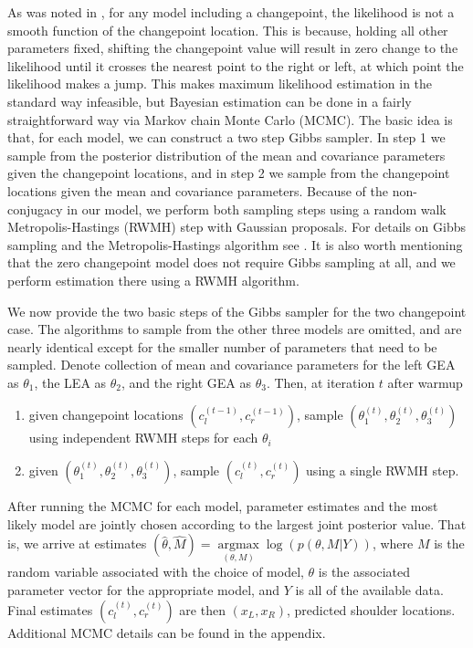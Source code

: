 \documentclass[12pt]{article}
\providecommand{\tightlist}{%
  \setlength{\itemsep}{0pt}\setlength{\parskip}{0pt}}
\begin{document}
As was noted in \citet{stephens1994}, for any model including a
changepoint, the likelihood is not a smooth function of the changepoint
location. This is because, holding all other parameters fixed, shifting
the changepoint value will result in zero change to the likelihood until
it crosses the nearest point to the right or left, at which point the
likelihood makes a jump. This makes maximum likelihood estimation in the
standard way infeasible, but Bayesian estimation can be done in a fairly
straightforward way via Markov chain Monte Carlo (MCMC). The basic idea
is that, for each model, we can construct a two step Gibbs sampler. In
step 1 we sample from the posterior distribution of the mean and
covariance parameters given the changepoint locations, and in step 2 we
sample from the changepoint locations given the mean and covariance
parameters. Because of the non-conjugacy in our model, we perform both
sampling steps using a random walk Metropolis-Hastings (RWMH) step with
Gaussian proposals. For details on Gibbs sampling and the
Metropolis-Hastings algorithm see \citet{gelman2013}. It is also worth
mentioning that the zero changepoint model does not require Gibbs
sampling at all, and we perform estimation there using a RWMH algorithm.

We now provide the two basic steps of the Gibbs sampler for the two
changepoint case. The algorithms to sample from the other three models
are omitted, and are nearly identical except for the smaller number of
parameters that need to be sampled. Denote collection of mean and
covariance parameters for the left GEA as \(\theta_1\), the LEA as
\(\theta_2\), and the right GEA as \(\theta_3\). Then, at iteration
\(t\) after warmup

\begin{enumerate}
\def\labelenumi{\arabic{enumi}.}
\tightlist
\item
  given changepoint locations \((c_l^{(t - 1)}, c_r^{(t - 1)})\), sample
  \((\theta_1^{(t)}, \theta_2^{(t)}, \theta_3^{(t)})\) using independent
  RWMH steps for each \(\theta_i\)
\item
  given \((\theta_1^{(t)}, \theta_2^{(t)}, \theta_3^{(t)})\), sample
  \((c_l^{(t)}, c_r^{(t)})\) using a single RWMH step.
\end{enumerate}

After running the MCMC for each model, parameter estimates and the most
likely model are jointly chosen according to the largest joint posterior
value. That is, we arrive at estimates
\((\hat{\theta}, \hat{M}) = \underset{(\theta, M)}{\operatorname{argmax}}{\log(p(\theta, M | Y))}\),
where \(M\) is the random variable associated with the choice of model,
\(\theta\) is the associated parameter vector for the appropriate model,
and \(Y\) is all of the available data. Final estimates
\((c_l^{(t)}, c_r^{(t)})\) are then \((x_L, x_R)\), predicted shoulder
locations. Additional MCMC details can be found in the appendix.
\end{document}
